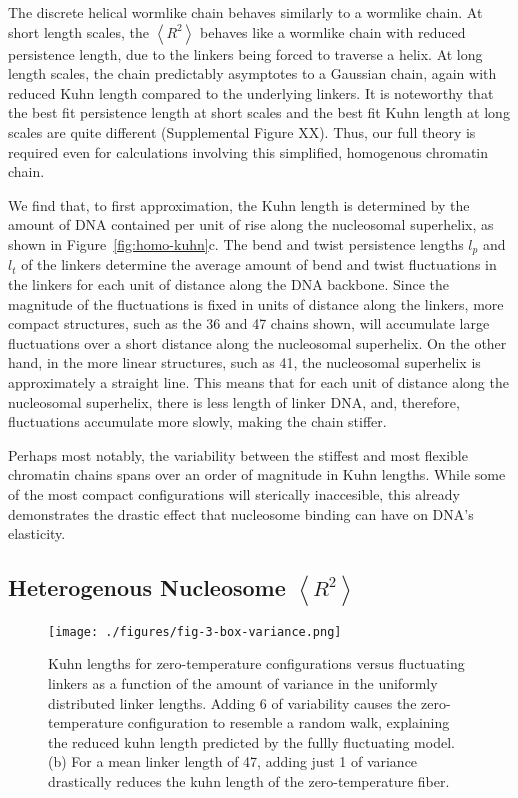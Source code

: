 \documentclass[%
 reprint,
superscriptaddress,
showpacs,preprintnumbers,
 amsmath,amssymb,
 aps,
 prl,
]{revtex4-1}
\newcommand{\RR}{\left\langle{}R^2\right\rangle{}}
\begin{document}
The discrete helical wormlike chain behaves similarly to a wormlike chain.
At short length scales, the $\RR$ behaves like a wormlike chain with reduced
    persistence length, due to the linkers being forced to traverse a helix.
At long length scales, the chain predictably asymptotes to a Gaussian
    chain, again with reduced Kuhn length compared to the underlying linkers.
It is noteworthy that the best fit persistence length at short scales and the
    best fit Kuhn length at long scales are quite different (Supplemental Figure
    XX).
Thus, our full theory is required even for calculations involving this
    simplified, homogenous chromatin chain.

We find that, to first approximation, the Kuhn length is determined by the
    amount of DNA contained per unit of rise along the nucleosomal superhelix,
    as shown in Figure~\ref{fig:homo-kuhn}c.
The bend and twist persistence lengths $l_p$ and $l_t$ of the linkers determine
    the average amount of bend and twist fluctuations in the linkers for each
    unit of distance along the DNA backbone.
Since the magnitude of the fluctuations is fixed in units of distance along the
    linkers, more compact structures, such as the \SI{36}{\basepair} and
    \SI{47}{\basepair} chains shown, will accumulate large fluctuations over a
    short distance along the nucleosomal superhelix.
On the other hand, in the more linear structures, such as \SI{41}{\basepair},
    the nucleosomal superhelix is approximately a straight line.
This means that for each unit of distance along the nucleosomal superhelix,
    there is less length of linker DNA, and, therefore, fluctuations accumulate
    more slowly, making the chain stiffer.

Perhaps most notably, the variability between the stiffest and most flexible
    chromatin chains spans over an order of magnitude in Kuhn lengths.
While some of the most compact configurations will sterically inaccesible, this
    already demonstrates the drastic effect that nucleosome binding can have on
    DNA's elasticity.

\subsection{\label{sec:homo-kuhn}Heterogenous Nucleosome $\RR$}



\begin{figure}[t]
    \centering
    \texttt{[image: ./figures/fig-3-box-variance.png]}
    \caption{Kuhn lengths for zero-temperature configurations versus
    fluctuating linkers as a function of the amount of variance in the uniformly
    distributed linker lengths.  Adding \SI{6}{\basepair} of variability causes the zero-temperature
    configuration to resemble a random walk, explaining the reduced kuhn
    length predicted by the fullly fluctuating model. (b) For a mean linker
    length of \SI{47}{\basepair}, adding just \SI{1}{\basepair} of variance
    drastically reduces the kuhn length of the zero-temperature fiber.}
\end{figure}
\end{document}

